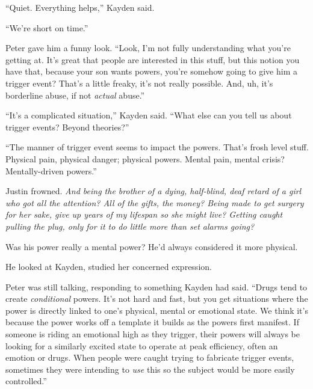 ``Quiet.  Everything helps,'' Kayden said.



``We're short on time.''



Peter gave him a funny look.  ``Look, I'm not fully understanding what you're getting at.  It's great that people are interested in this stuff, but this notion you have that, because your son wants powers, you're somehow going to give him a trigger event?  That's a little freaky, it's not really possible.  And, uh, it's borderline abuse, if not \emph{actual} abuse.''



``It's a complicated situation,'' Kayden said.  ``What else can you tell us about trigger events?  Beyond theories?''



``The manner of trigger event seems to impact the powers.  That's frosh level stuff.  Physical pain, physical danger; physical powers.  Mental pain, mental crisis?  Mentally-driven powers.''



Justin frowned.  \emph{And being the brother of a dying, half-blind, deaf retard of a girl who got all the attention?  All of the gifts, the money?  Being made to get surgery for her sake, give up years of my lifespan so she might live?  Getting caught pulling the plug, only for it to do little more than set alarms going?}



Was his power really a mental power?  He'd always considered it more physical.



He looked at Kayden, studied her concerned expression.



Peter was still talking, responding to something Kayden had said.  ``Drugs tend to create \emph{conditional} powers.  It's not hard and fast, but you get situations where the power is directly linked to one's physical, mental or emotional state.  We think it's because the power works off a template it builds as the powers first manifest.  If someone is riding an emotional high as they trigger, their powers will always be looking for a similarly excited state to operate at peak efficiency, often an emotion or drugs.  When people were caught trying to fabricate trigger events, sometimes they were intending to \emph{use} this so the subject would be more easily controlled.''




